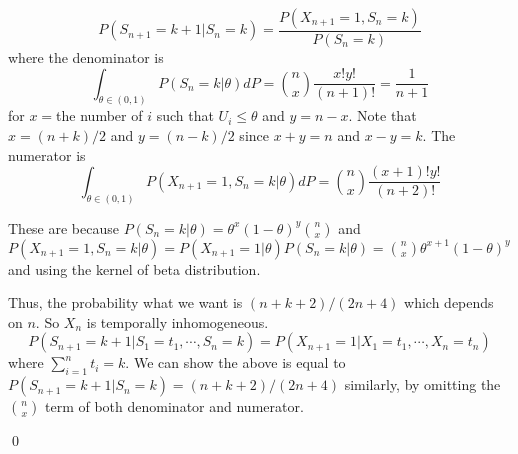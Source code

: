 \begin{problem}[5.1.6] \hfill
	
	\[
		P(S_{n+1} = k+1 \lvert S_n = k) = \frac{P(X_{n+1} = 1, S_n = k)}{P(S_n = k)}
	\]
	where the denominator is
	\[
		\int_{\theta \in (0, 1)}P(S_n = k \lvert \theta) dP = {n \choose x} \frac{x!y!}{(n+1)!} = \frac{1}{n+1}
	\]
	for $x = $the number of $i$ such that $U_i \leq \theta$ and $y = n-x$.
	Note that $x = (n+k)/2$ and $y = (n-k)/2$ since $x+y = n$ and $x-y = k$.
	The numerator is
	\[
		\int_{\theta \in (0, 1)}P(X_{n+1} = 1, S_n = k \lvert \theta)dP = {n \choose x}\frac{(x+1)!y!}{(n+2)!}
	\]

	These are because $P(S_n = k \lvert \theta) = \theta^x (1-\theta)^y {n \choose x}$ and $P(X_{n+1} = 1, S_n = k \lvert \theta) = P(X_{n+1} = 1 \lvert \theta)P(S_n = k \lvert \theta) = {n \choose x} \theta^{x+1}(1-\theta)^y$ and using the kernel of beta distribution.

	Thus, the probability what we want is $(n+k+2)/(2n+4)$ which depends on $n$.
	So $X_n$ is temporally inhomogeneous.
	\[
		P(S_{n+1} = k+1 \lvert S_1 = t_1, \cdots, S_n = k) = P(X_{n+1} = 1 \lvert X_1 = t_1, \cdots, X_n = t_n)
	\]
	where $\sum_{i=1}^n t_i = k$.
	We can show the above is equal to $P(S_{n+1} = k+1 \lvert S_n = k) = (n+k+2)/(2n+4)$ similarly, by omitting the ${n \choose x}$ term of both denominator and numerator.

	\qed
\end{problem}
